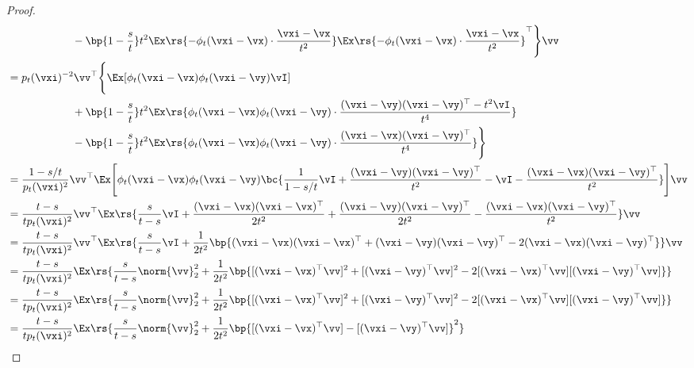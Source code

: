 \documentclass[../../book-main.tex]{subfiles}
\begin{document}
\begin{proof}
\begin{align}
            & \qquad \qquad \qquad -\bp{1 -
            \frac{s}{t}}t^{2}\Ex\rs{-\phi_{t}(\vxi - \vx)\cdot\frac{\vxi
            - \vx}{t^{2}}}\Ex\rs{-\phi_{t}(\vxi - \vx)\cdot\frac{\vxi -
        \vx}{t^{2}}}^{\top}\Bigg\}\vv \\
        &= p_{t}(\vxi)^{-2}\vv^{\top}\Bigg\{\Ex[\phi_{t}(\vxi -
            \vx)\phi_{t}(\vxi - \vy)\vI] \\
            & \qquad \qquad \qquad + \bp{1 -
            \frac{s}{t}}t^{2}\Ex\rs{\phi_{t}(\vxi - \vx)\phi_{t}(\vxi
                - \vy)\cdot\frac{(\vxi - \vy)(\vxi - \vy)^{\top} -
            t^{2}\vI}{t^{4}}} \\
            & \qquad \qquad \qquad -\bp{1 -
            \frac{s}{t}}t^{2}\Ex\rs{\phi_{t}(\vxi - \vx)\phi_{t}(\vxi -
        \vy)\cdot\frac{(\vxi - \vx)(\vxi - \vy)^{\top}}{t^{4}}}\Bigg\} \\
        &= \frac{1 -
        s/t}{p_{t}(\vxi)^{2}}\vv^{\top}\Ex\mathopen{}\Bigg[\phi_{t}(\vxi
            - \vx)\phi_{t}(\vxi - \vy)\bc{\frac{1}{1 - s/t}\vI +
                \frac{(\vxi - \vy)(\vxi - \vy)^{\top}}{t^{2}} - \vI -
        \frac{(\vxi - \vx)(\vxi - \vy)^{\top}}{t^{2}}}\Bigg]\vv \\
        &= \frac{t - s}{tp_{t}(\vxi)^{2}}\vv^{\top}\Ex\rs{\frac{s}{t
            - s}\vI +\frac{(\vxi - \vx)(\vxi - \vx)^{\top}}{2t^{2}} +
            \frac{(\vxi - \vy)(\vxi - \vy)^{\top}}{2t^{2}} - \frac{(\vxi
        - \vx)(\vxi - \vy)^{\top}}{t^{2}}}\vv \\
        &= \frac{t - s}{tp_{t}(\vxi)^{2}}\vv^{\top}\Ex\rs{\frac{s}{t
            - s}\vI +\frac{1}{2t^{2}}\bp{(\vxi - \vx)(\vxi - \vx)^{\top}
                + (\vxi - \vy)(\vxi - \vy)^{\top} - 2(\vxi - \vx)(\vxi -
        \vy)^{\top}}}\vv \\
        &= \frac{t - s}{tp_{t}(\vxi)^{2}}\Ex\rs{\frac{s}{t -
            s}\norm{\vv}_{2}^{2} +\frac{1}{2t^{2}}\bp{[(\vxi -
                \vx)^{\top}\vv]^{2} + [(\vxi - \vy)^{\top}\vv]^{2} - 2[(\vxi
        - \vx)^{\top}\vv][(\vxi - \vy)^{\top}\vv]}} \\
        &= \frac{t - s}{tp_{t}(\vxi)^{2}}\Ex\rs{\frac{s}{t -
            s}\norm{\vv}_{2}^{2} +\frac{1}{2t^{2}}\bp{[(\vxi -
                \vx)^{\top}\vv]^{2} + [(\vxi - \vy)^{\top}\vv]^{2} - 2[(\vxi
        - \vx)^{\top}\vv][(\vxi - \vy)^{\top}\vv]}} \\
        &= \frac{t - s}{tp_{t}(\vxi)^{2}}\Ex\rs{\frac{s}{t -
            s}\norm{\vv}_{2}^{2} +\frac{1}{2t^{2}}\bp{[(\vxi -
        \vx)^{\top}\vv] - [(\vxi - \vy)^{\top}\vv]}^{2}} \\

\end{align}
\end{proof}
\end{document}
